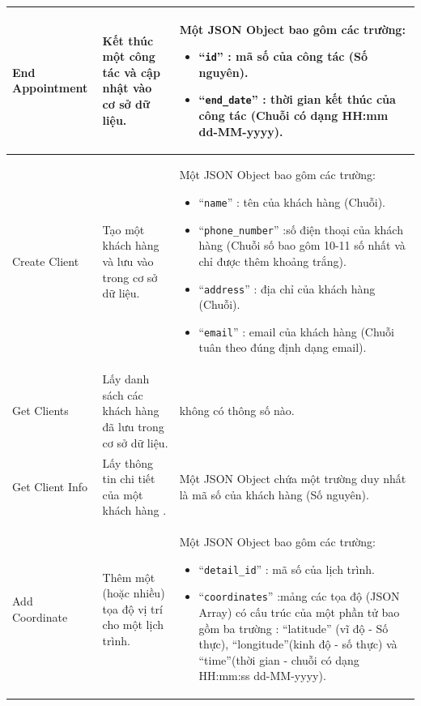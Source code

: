 \documentclass{article}
\begin{document}
\begin{longtable}{ | p{} |p{} | p{}  | }
\hline
End Appointment  & 
Kết thúc một công tác và cập nhật vào cơ sở dữ liệu. &
Một JSON Object bao gôm các trường: 
\begin{itemize}
  \item “\verb|id|” : mã số của công tác (Số nguyên).  
  \item “\verb|end_date|” : thời gian kết thúc của công tác (Chuỗi có dạng HH:mm dd-MM-yyyy).
\end{itemize}
\\ 

\hline
Create Client & 
Tạo một khách hàng và lưu vào trong cơ sở dữ liệu. &
Một JSON Object bao gôm các trường: 
\begin{itemize}
  \item “\verb|name|” : tên của khách hàng (Chuỗi).  
  \item “\verb|phone_number|” :số điện thoại của khách hàng (Chuỗi số bao gôm 10-11 số nhất và chỉ được thêm khoảng trắng). 
  \item “\verb|address|” :  địa chỉ của khách hàng (Chuỗi).
  \item “\verb|email|” : email của khách hàng (Chuỗi tuân theo đúng định dạng email).
\end{itemize}
\\ 

\hline
Get Clients & 
Lấy danh sách các khách hàng đã lưu trong cơ sở dữ liệu. &
không có thông số nào.
\\ 

\hline
Get Client Info & 
Lấy thông tin chi tiết của một khách hàng . &
Một JSON Object chứa một trường duy nhất là mã số của khách hàng (Số nguyên).
\\ 

\hline
Add Coordinate & 
Thêm một (hoặc nhiều) tọa độ vị trí cho một lịch trình. &
Một JSON Object bao gôm các trường: 
\begin{itemize}
  \item “\verb|detail_id|” : mã số của lịch trình.  
\item “\verb|coordinates|” :mảng các tọa độ (JSON Array) có cấu trúc của một phần tử bao gồm ba trường : “latitude” (vĩ độ - Số thực), “longitude”(kinh độ - số thực) và
“time”(thời gian - chuỗi có dạng HH:mm:ss dd-MM-yyyy).
\end{itemize}
\\ 


\end{longtable}
\end{document}
